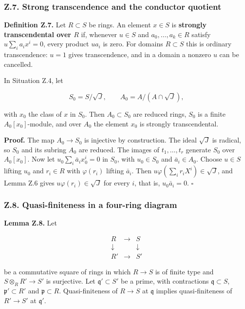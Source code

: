 \documentclass[11pt]{article}
\begin{document}
\subsubsection{Z.7. Strong transcendence and the conductor
quotient}\label{z.7.-strong-transcendence-and-the-conductor-quotient}

\textbf{Definition Z.7.} Let \(R\subset S\) be rings. An element
\(x\in S\) is \textbf{strongly transcendental over \(R\)} if, whenever
\(u\in S\) and \(a_0,\ldots,a_k\in R\) satisfy \(u\sum_ia_ix^i=0\),
every product \(ua_i\) is zero. For domains \(R\subset S\) this is
ordinary transcendence: \(u=1\) gives transcendence, and in a domain a
nonzero \(u\) can be cancelled.

In Situation Z.4, let

\[
S_0=S/\sqrt J,\qquad A_0=A/(A\cap\sqrt J),
\]

with \(x_0\) the class of \(x\) in \(S_0\). Then \(A_0\subset S_0\) are
reduced rings, \(S_0\) is a finite \(A_0[x_0]\)-module, and over \(A_0\)
the element \(x_0\) is strongly transcendental.

\textbf{Proof.} The map \(A_0\to S_0\) is injective by construction. The
ideal \(\sqrt J\) is radical, so \(S_0\) and its subring \(A_0\) are
reduced. The images of \(t_1,\ldots,t_r\) generate \(S_0\) over
\(A_0[x_0]\). Now let \(u_0\sum_i\bar a_ix_0^i=0\) in \(S_0\), with
\(u_0\in S_0\) and \(\bar a_i\in A_0\). Choose \(u\in S\) lifting
\(u_0\) and \(r_i\in R\) with \(\varphi(r_i)\) lifting \(\bar a_i\).
Then \(u\varphi(\sum_ir_iX^i)\in\sqrt J\), and Lemma Z.6 gives
\(u\varphi(r_i)\in\sqrt J\) for every \(i\), that is, \(u_0\bar a_i=0\).
\(\square\)

\subsubsection{Z.8. Quasi-finiteness in a four-ring
diagram}\label{z.8.-quasi-finiteness-in-a-four-ring-diagram}

\textbf{Lemma Z.8.} Let

\[
\begin{array}{ccc}
R&\longrightarrow&S\\
\downarrow&&\downarrow\\
R'&\longrightarrow&S'
\end{array}
\]

be a commutative square of rings in which \(R\to S\) is of finite type
and \(S\otimes_RR'\to S'\) is surjective. Let \(\mathfrak q'\subset S'\)
be a prime, with contractions \(\mathfrak q\subset S\),
\(\mathfrak p'\subset R'\) and \(\mathfrak p\subset R\).
Quasi-finiteness of \(R\to S\) at \(\mathfrak q\) implies
quasi-finiteness of \(R'\to S'\) at \(\mathfrak q'\).
\end{document}
